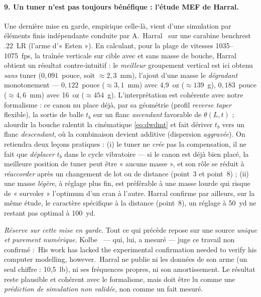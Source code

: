 \documentclass[12pt,a4paper]{article}
\begin{document}
	\paragraph{9. Un tuner n'est pas toujours bénéfique : l'étude MEF de Harral.} Une dernière mise en garde, empirique celle-là, vient d'une simulation par éléments finis indépendante conduite par A.\ Harral~\cite{Harral} sur une carabine benchrest .22~LR (l'arme d'« Esten »). En calculant, pour la plage de vitesses 1035--1075~fps, la traînée verticale sur cible avec et sans masse de bouche, Harral obtient un résultat contre-intuitif : le \emph{meilleur} groupement vertical est ici obtenu \emph{sans} tuner ($0{,}091$~pouce, soit $\approx 2{,}3$~mm), l'ajout d'une masse le \emph{dégradant} monotonement --- $0{,}122$~pouce ($\approx 3{,}1$~mm) avec 4,9~oz ($\approx 139$~g), $0{,}183$~pouce ($\approx 4{,}6$~mm) avec 16~oz ($\approx 454$~g). L'interprétation est cohérente avec notre formalisme : ce canon nu place déjà, par sa géométrie (profil \emph{reverse taper} flexible), la sortie de balle $t_b$ sur un flanc \emph{ascendant} favorable de $\theta(L,t)$ ; alourdir la bouche ralentit la cinématique \eqref{eq:dwdmt} et fait dériver $t_b$ vers un flanc \emph{descendant}, où la combinaison devient additive (dispersion \emph{aggravée}). On retiendra deux leçons pratiques : (i) le tuner ne \emph{crée} pas la compensation, il ne fait que \emph{déplacer} $t_b$ dans le cycle vibratoire --- si le canon est déjà bien placé, la meilleure position de tuner peut être « aucune masse », et son rôle se réduit à \emph{réaccorder} après un changement de lot ou de distance (point~3 et point~8) ; (ii) une masse \emph{légère}, à réglage plus fin, est préférable à une masse lourde qui risque de « survoler » l'optimum d'un cran à l'autre. Harral confirme par ailleurs, sur la même étude, le caractère spécifique à la distance (point~8), un réglage à 50~yd ne restant pas optimal à 100~yd.

	\emph{Réserve sur cette mise en garde.} Tout ce qui précède repose sur une source \emph{unique et purement numérique}. Kolbe~\cite{KolbeSim} — qui, lui, a mesuré — juge ce travail non confirmé : \og\,His work has lacked the experimental confirmation needed to verify his computer modelling, however.\,\fg{} Harral ne publie ni les données de son arme (un seul chiffre : 10,5~lb), ni ses fréquences propres, ni son amortissement. Le résultat reste plausible et cohérent avec le formalisme, mais doit être lu comme une \emph{prédiction de simulation non validée}, non comme un fait mesuré.
\end{document}
